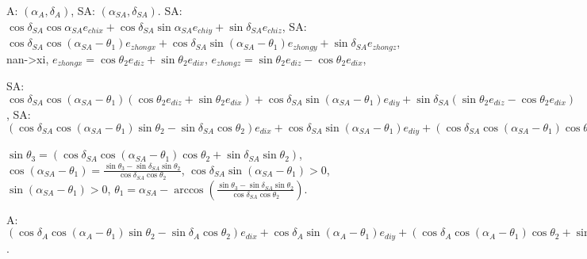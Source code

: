 \documentclass[a4paper,12pt]{article}
\theoremstyle{definition}
\begin{document}
A: $(\alpha_A, \delta_A)$, SA: $(\alpha_{SA}, \delta_{SA})$.
SA: $\cos\delta_{SA}\cos\alpha_{SA}e_{chix}+\cos\delta_{SA}\sin\alpha_{SA}e_{chiy}+\sin\delta_{SA}e_{chiz}$, SA: $\cos\delta_{SA}\cos(\alpha_{SA}-{\theta_1})e_{zhongx}+\cos\delta_{SA}\sin(\alpha_{SA}-{\theta_1})e_{zhongy}+\sin\delta_{SA}e_{zhongz}$, nan->xi, $e_{zhongx}=\cos{\theta_2}e_{diz}+\sin{\theta_2}e_{dix}$, $e_{zhongz}=\sin{\theta_2}e_{diz}-\cos{\theta_2}e_{dix}$,

SA: $\cos\delta_{SA}\cos(\alpha_{SA}-{\theta_1})(\cos{\theta_2}e_{diz}+\sin{\theta_2}e_{dix})+\cos\delta_{SA}\sin(\alpha_{SA}-{\theta_1})e_{diy}+\sin\delta_{SA}(\sin{\theta_2}e_{diz}-\cos{\theta_2}e_{dix})$, SA: $(\cos\delta_{SA}\cos(\alpha_{SA}-{\theta_1})\sin{\theta_2}-\sin\delta_{SA}\cos{\theta_2})e_{dix}+\cos\delta_{SA}\sin(\alpha_{SA}-{\theta_1})e_{diy}+(\cos\delta_{SA}\cos(\alpha_{SA}-{\theta_1})\cos{\theta_2}+\sin\delta_{SA}\sin{\theta_2})e_{diz}$

$\sin\theta_3=(\cos\delta_{SA}\cos(\alpha_{SA}-{\theta_1})\cos{\theta_2}+\sin\delta_{SA}\sin{\theta_2})$, $\cos(\alpha_{SA}-{\theta_1})=\frac{\sin\theta_3-\sin\delta_{SA}\sin{\theta_2}}{\cos\delta_{SA}\cos{\theta_2}}$, $\cos\delta_{SA}\sin(\alpha_{SA}-{\theta_1})>0$, $\sin(\alpha_{SA}-{\theta_1})>0$, $\theta_1=\alpha_{SA}-\arccos(\frac{\sin\theta_3-\sin\delta_{SA}\sin{\theta_2}}{\cos\delta_{SA}\cos{\theta_2}})$.

A: $(\cos\delta_A\cos(\alpha_A-{\theta_1})\sin{\theta_2}-\sin\delta_A\cos{\theta_2})e_{dix}+\cos\delta_A\sin(\alpha_A-{\theta_1})e_{diy}+(\cos\delta_A\cos(\alpha_A-{\theta_1})\cos{\theta_2}+\sin\delta_A\sin{\theta_2})e_{diz}$.
\end{document}
